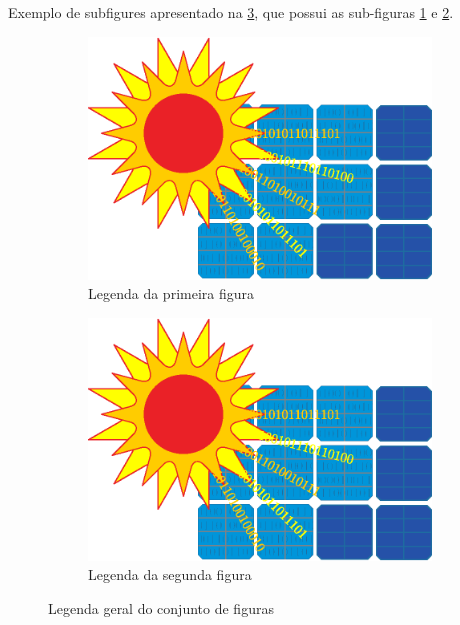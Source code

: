 Exemplo de subfigures apresentado na \ref{fig:figuras_conjunto}, que possui as sub-figuras \ref{fig:imagem1} e \ref{fig:imagem2}.
\begin{figure}[h]
    \centering
    \begin{subfigure}{0.35\textwidth}
        \centering
        \includegraphics[width=\linewidth, angle=90]{../class/figs/logo_capa}
        \caption{Legenda da primeira figura}
        \label{fig:imagem1}
    \end{subfigure}
    \hspace{15mm}
    \begin{subfigure}{0.35\textwidth}
        \centering
        \includegraphics[scale=0.45, angle=45]{../class/figs/logo_capa}
        \caption{Legenda da segunda figura}
        \label{fig:imagem2}
    \end{subfigure}
    \caption{Legenda geral do conjunto de figuras}
    \label{fig:figuras_conjunto}
\end{figure}



